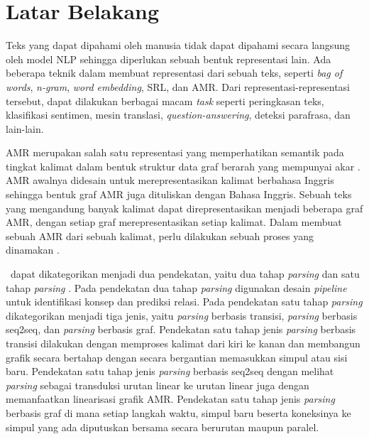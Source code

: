 \section{Latar Belakang}

Teks yang dapat dipahami oleh manusia tidak dapat dipahami secara langsung oleh model \gls{NLP} sehingga diperlukan sebuah bentuk representasi lain.
Ada beberapa teknik dalam membuat representasi dari sebuah teks, seperti \textit{bag of words}, \textit{n-gram}, \textit{word embedding}, \gls{SRL}, dan \gls{AMR}.
Dari representasi-representasi tersebut, dapat dilakukan berbagai macam \textit{task} seperti peringkasan teks, klasifikasi sentimen, mesin translasi, \textit{question-answering}, deteksi parafrasa, dan lain-lain.

\gls{AMR} merupakan salah satu representasi yang memperhatikan semantik pada tingkat kalimat dalam bentuk struktur data graf berarah yang mempunyai akar .
\gls{AMR} awalnya didesain untuk merepresentasikan kalimat berbahasa Inggris sehingga bentuk graf \gls{AMR} juga dituliskan dengan Bahasa Inggris.
Sebuah teks yang mengandung banyak kalimat dapat direpresentasikan menjadi beberapa graf \gls{AMR}, dengan setiap graf merepresentasikan setiap kalimat.
Dalam membuat sebuah \gls{AMR} dari sebuah kalimat, perlu dilakukan sebuah proses yang dinamakan \amrparsing.

\amrparsing~dapat dikategorikan menjadi dua pendekatan, yaitu dua tahap \textit{parsing} dan satu tahap \textit{parsing} .
Pada pendekatan dua tahap \textit{parsing} digunakan desain \textit{pipeline} untuk identifikasi konsep dan prediksi relasi.
Pada pendekatan satu tahap \textit{parsing} dikategorikan menjadi tiga jenis, yaitu \textit{parsing} berbasis transisi, \textit{parsing} berbasis \gls{seq2seq}, dan \textit{parsing} berbasis graf.
Pendekatan satu tahap jenis \textit{parsing} berbasis transisi dilakukan dengan memproses kalimat dari kiri ke kanan dan membangun grafik secara bertahap dengan secara bergantian memasukkan simpul atau sisi baru.
Pendekatan satu tahap jenis \textit{parsing} berbasis \gls{seq2seq} dengan melihat \textit{parsing} sebagai transduksi urutan linear ke urutan linear juga dengan memanfaatkan linearisasi grafik AMR.
Pendekatan satu tahap jenis \textit{parsing} berbasis graf di mana setiap langkah waktu, simpul baru beserta koneksinya ke simpul yang ada diputuskan bersama secara berurutan maupun paralel.

